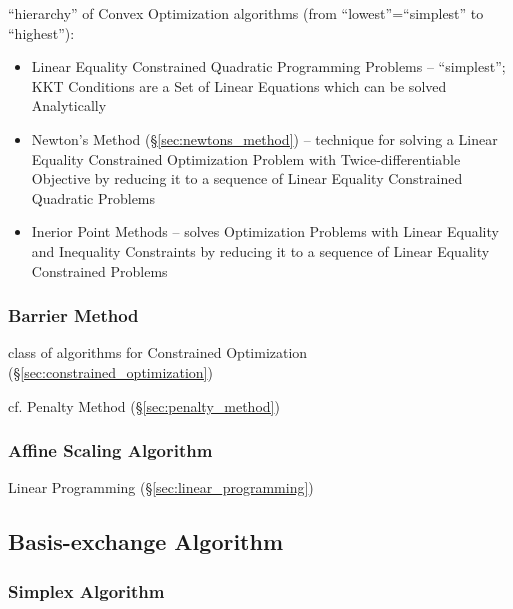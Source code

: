 ``hierarchy'' of Convex Optimization algorithms (from ``lowest''=``simplest'' to
``highest''):
\begin{itemize}
  \item Linear Equality Constrained Quadratic Programming Problems --
    ``simplest''; KKT Conditions are a Set of Linear Equations which can be
    solved Analytically
  \item Newton's Method (\S\ref{sec:newtons_method}) -- technique for solving a
    Linear Equality Constrained Optimization Problem with Twice-differentiable
    Objective by reducing it to a sequence of Linear Equality Constrained
    Quadratic Problems
  \item Inerior Point Methods -- solves Optimization Problems with Linear
    Equality and Inequality Constraints by reducing it to a sequence of Linear
    Equality Constrained Problems
\end{itemize}



\subsubsection{Barrier Method}\label{sec:barrier_method}

class of algorithms for Constrained Optimization
(\S\ref{sec:constrained_optimization})

cf. Penalty Method (\S\ref{sec:penalty_method})



\subsubsection{Affine Scaling Algorithm}\label{sec:affine_scaling}

Linear Programming (\S\ref{sec:linear_programming})



\subsection{Basis-exchange Algorithm}\label{sec:basis_exchange}

\subsubsection{Simplex Algorithm}\label{sec:simplex_algorithm}

